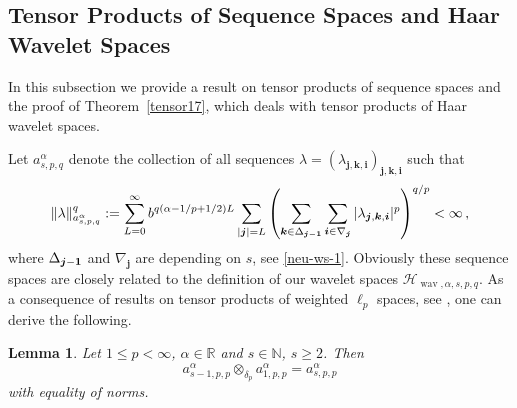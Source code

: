 \documentclass[12pt]{article}
\DeclareMathOperator{\wav}{wav}
\newtheorem{lemma}{Lemma}
\newcommand{\bsk}{\boldsymbol{k}}
\newcommand{\bsi}{\boldsymbol{i}}
\newcommand{\bsj}{\boldsymbol{j}}
\newcommand{\HH}{\mathcal{H}}
\newcommand{\re}{\mathbb{R}}
\newcommand{\N}{\mathbb{N}}
\newcommand{\mig}[1]{\textcolor{blue}{#1}}
\newcommand{\red}[1]{\textcolor{red}{#1}}
\begin{document}
\subsection{Tensor Products of Sequence Spaces and Haar Wavelet Spaces} 
\label{APP:TPSS}

In this subsection we provide a result on tensor products of sequence spaces and the proof
of Theorem~\ref{tensor17}, which deals with tensor products of Haar wavelet spaces.


Let $a^\alpha_{s,p,q}$ denote the collection of all sequences $\lambda =(\lambda_{\bsj,\bsk,\bsi})_{\bsj,\bsk,\bsi}$
such that
\begin{equation*}
\|\lambda\|^q_{a^\alpha_{s,p,q}} :=
\sum^\infty_{L=0} b^{q(\alpha-1/p+1/2)L} \sum_{|\bsj|=L}
\left( \sum_{\bsk\in \Delta_{\bsj -{\bf 1}}} 
\sum_{\bsi \in \nabla_{\bsj}}
|\lambda_{\bsj,\bsk,\bsi}|^p \right)^{q/p} <\infty\, ,
\end{equation*}
where $\Delta_{\bsj -{\bf 1}} $ and $\nabla_{\bsj}$ are depending on $s$, see \eqref{neu-ws-1}.
Obviously these sequence spaces are closely related to the definition of our wavelet spaces 
$\HH_{\wav,\alpha,s,p,q}$.
As a consequence of results on tensor products of weighted $\ell_p$ spaces, see \cite{SU1},
one can derive the following.


\begin{lemma}\label{tensor5}
 Let $1 \le p < \infty$, $\alpha \in \re$ and $s\in \N$, $s\ge 2$.
 Then
 \[
 a^\alpha_{s-1,p,p}  \otimes_{\delta_p} a^\alpha_{1,p,p} =  a^\alpha_{s,p,p} 
 \]
 with equality of norms. 
\end{lemma}
\end{document}
